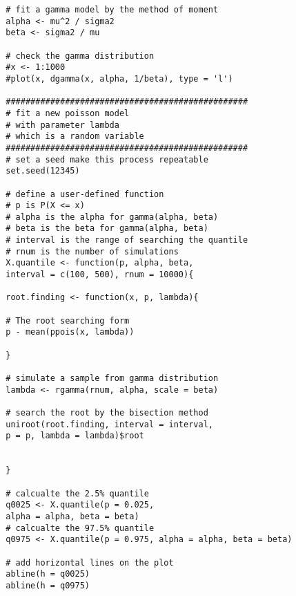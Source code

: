 \begin{enumerate}
\begin{verbatim}
		# fit a gamma model by the method of moment
		alpha <- mu^2 / sigma2
		beta <- sigma2 / mu
		
		# check the gamma distribution
		#x <- 1:1000 
		#plot(x, dgamma(x, alpha, 1/beta), type = 'l')
		
		#################################################
		# fit a new poisson model 
		# with parameter lambda 
		# which is a random variable
		#################################################
		# set a seed make this process repeatable
		set.seed(12345)
		
		# define a user-defined function
		# p is P(X <= x)
		# alpha is the alpha for gamma(alpha, beta)
		# beta is the beta for gamma(alpha, beta)
		# interval is the range of searching the quantile
		# rnum is the number of simulations
		X.quantile <- function(p, alpha, beta, 
		interval = c(100, 500), rnum = 10000){
		
		root.finding <- function(x, p, lambda){
		
		# The root searching form
		p - mean(ppois(x, lambda))
		
		}
		
		# simulate a sample from gamma distribution
		lambda <- rgamma(rnum, alpha, scale = beta)
		
		# search the root by the bisection method
		uniroot(root.finding, interval = interval, 
		p = p, lambda = lambda)$root
		
		
		}
		
		# calcualte the 2.5% quantile
		q0025 <- X.quantile(p = 0.025, 
		alpha = alpha, beta = beta)
		# calcualte the 97.5% quantile
		q0975 <- X.quantile(p = 0.975, alpha = alpha, beta = beta)
		
		# add horizontal lines on the plot
		abline(h = q0025)
		abline(h = q0975)
	\end{verbatim}
\end{enumerate}